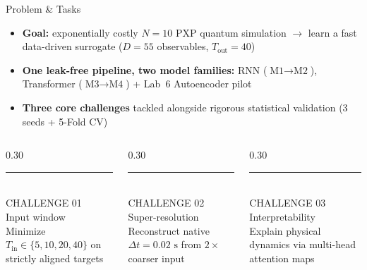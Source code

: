 \documentclass[aspectratio=169,10pt]{beamer}
\begin{document}
\begin{frame}{Problem \& Tasks}
    \vspace{0.05cm}
    \begin{itemize}\setlength{\itemsep}{7pt}
        \item \fontsize{10}{13.5}\selectfont \textbf{Goal:} exponentially costly $N=10$ PXP quantum simulation $\rightarrow$ learn a fast data-driven surrogate ($D=55$ observables, $T_{\text{out}}=40$)
        \item \textbf{One leak-free pipeline, two model families:} RNN ($\text{M1}\rightarrow\text{M2}$), Transformer ($\text{M3}\rightarrow\text{M4}$) + Lab~6 Autoencoder pilot
        \item \textbf{Three core challenges} tackled alongside rigorous statistical validation (3 seeds + 5-Fold CV)
    \end{itemize}

    \vspace{0.48cm}
    \begin{columns}[T]
        \begin{column}{0.30\textwidth}
            {\color{rulegray}\rule{\linewidth}{0.6pt}}\\[0.22cm]
            {\fontsize{7.5}{9}\selectfont\color{accentbronze}\MakeUppercase{Challenge 01}}\\[0.15cm]
            {\rmfamily\fontsize{14}{17}\selectfont\color{textdark}Input window}\\[0.1cm]
            {\fontsize{8.8}{11.5}\selectfont\color{textmuted}Minimize $T_{\text{in}} \in \{5,10,20,40\}$ on strictly aligned targets}
        \end{column}
        \begin{column}{0.30\textwidth}
            {\color{rulegray}\rule{\linewidth}{0.6pt}}\\[0.22cm]
            {\fontsize{7.5}{9}\selectfont\color{accentbronze}\MakeUppercase{Challenge 02}}\\[0.15cm]
            {\rmfamily\fontsize{14}{17}\selectfont\color{textdark}Super-resolution}\\[0.1cm]
            {\fontsize{8.8}{11.5}\selectfont\color{textmuted}Reconstruct native $\Delta t = 0.02\text{ s}$ from $2\times$ coarser input}
        \end{column}
        \begin{column}{0.30\textwidth}
            {\color{rulegray}\rule{\linewidth}{0.6pt}}\\[0.22cm]
            {\fontsize{7.5}{9}\selectfont\color{accentbronze}\MakeUppercase{Challenge 03}}\\[0.15cm]
            {\rmfamily\fontsize{14}{17}\selectfont\color{textdark}Interpretability}\\[0.1cm]
            {\fontsize{8.8}{11.5}\selectfont\color{textmuted}Explain physical dynamics via multi-head attention maps}
        \end{column}
    \end{columns}
\end{frame}
\end{document}
